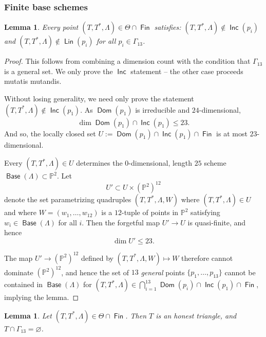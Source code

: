 \documentclass[reqno, 11pt]{amsart}
\theoremstyle{plain}
\newtheorem{lemma}[theorem]{Lemma}
\theoremstyle{remark}
\renewcommand{\P}{\mathbb{P}}
\DeclareMathOperator{\Dom}{\mathsf{Dom}}
\DeclareMathOperator{\Fin}{\mathsf{Fin}}
\DeclareMathOperator{\Lin}{\mathsf{Lin}}
\DeclareMathOperator{\Inc}{\mathsf{Inc}}
\DeclareMathOperator{\Base}{\mathsf{Base}}
\begin{document}
\subsubsection{Finite base schemes}
\label{sec:understanding-s-cap}



\begin{lemma}
  \label{lemma:finite} Every point
  $(T, T^{*}, \Lambda) \in \Theta \cap \Fin$ satisfies:
  $(T,T^{*},\Lambda) \notin \Inc(p_{i})$ and
  $(T,T^{*},\Lambda) \notin \Lin(p_{i})$ for all
  $p_{i} \in \Gamma_{13}$.
\end{lemma}

\begin{proof}
  This follows from combining a dimension count with the condition
  that $\Gamma_{13}$ is a general set. We only prove the $\Inc$
  statement -- the other case proceeds mutatis mutandis.

  Without losing generality, we need only prove the statement
  $(T,T^{*},\Lambda) \notin \Inc(p_{1})$.  As $\Dom(p_1)$ is
  irreducible and $24$-dimensional,
  \[\dim \Dom(p_1) \cap \Inc(p_1)  \leq 23.\] And so, the locally closed
  set $U := \Dom(p_1) \cap \Inc(p_1) \cap \Fin$ is at most $23$-dimensional.

  Every $(T,T^{*},\Lambda) \in U$ determines the $0$-dimensional, length
  $25$ scheme $\Base(\Lambda) \subset \P^{2}$. Let
  \[U' \subset U \times (\P^{2})^{12}\] denote the set
  parametrizing quadruples $(T,T^{*},\Lambda,W)$ where
  $(T,T^{*},\Lambda) \in U$ and where $W = (w_1, \dots, w_{12})$ is a
  $12$-tuple of points in $\P^{2}$ satisfying $w_i \in \Base(\Lambda)$
  for all $i$. Then the forgetful map $U' \to U$ is quasi-finite, and
  hence \[\dim U' \leq 23.\]

  The map $U' \to (\P^{2})^{12}$ defined by
  $(T,T^{*}, \Lambda, W) \mapsto W$ therefore cannot dominate
  $(\P^{2})^{12}$, and hence the set of $13$ \emph{general} points
  $\{p_1, \dots, p_{13}\}$ cannot be contained in $\Base(\Lambda)$ for
  $(T,T^{*},\Lambda) \in \bigcap_{i=1}^{13}\Dom(p_{i}) \cap
  \Inc(p_{1}) \cap \Fin$, implying the lemma.
\end{proof}



\begin{lemma}
  \label{lemma:finitehonest}
  Let $(T,T^{*},\Lambda) \in \Theta \cap \Fin$. Then $T$ is an honest
  triangle, and $T \cap \Gamma_{13} = \varnothing$.
\end{lemma}
\end{document}

